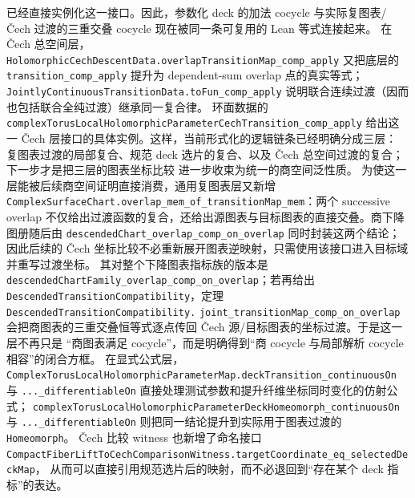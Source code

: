\documentclass[UTF8,fontset=none,a4paper,11pt]{ctexart}
\begin{document}
\begin{sloppypar}
已经直接实例化这一接口。因此，参数化 deck 的加法 cocycle 与实际复图表/Čech 过渡的三重交叠
cocycle 现在被同一条可复用的 Lean 等式连接起来。
在 Čech 总空间层，
\texttt{HolomorphicCechDescentData.overlapTransitionMap\_comp\_apply} 又把底层的
\texttt{transition\_comp\_apply} 提升为 dependent-sum overlap 点的真实等式；
\texttt{JointlyContinuousTransitionData.toFun\_comp\_apply} 说明联合连续过渡（因而也包括联合全纯过渡）继承同一复合律。
环面数据的
\texttt{complexTorusLocalHolomorphicParameterCechTransition\_comp\_apply}
给出这一 Čech 层接口的具体实例。这样，当前形式化的逻辑链条已经明确分成三层：
复图表过渡的局部复合、规范 deck 选片的复合、以及 Čech 总空间过渡的复合；下一步才是把三层的图表坐标比较
进一步收束为统一的商空间泛性质。
为使这一层能被后续商空间证明直接消费，通用复图表层又新增
\texttt{ComplexSurfaceChart.overlap\_mem\_of\_transitionMap\_mem}：两个 successive overlap
不仅给出过渡函数的复合，还给出源图表与目标图表的直接交叠。商下降图册随后由
\texttt{descendedChart\_overlap\_comp\_on\_overlap} 同时封装这两个结论；因此后续的
Čech 坐标比较不必重新展开图表逆映射，只需使用该接口进入目标域并重写过渡坐标。
其对整个下降图表指标族的版本是
\texttt{descendedChartFamily\_overlap\_comp\_on\_overlap}；若再给出
\texttt{DescendedTransitionCompatibility}，定理
\texttt{DescendedTransitionCompatibility.}\allowbreak
\texttt{joint\_transitionMap\_comp\_on\_overlap}
会把商图表的三重交叠恒等式逐点传回 Čech 源/目标图表的坐标过渡。于是这一层不再只是
“商图表满足 cocycle”，而是明确得到“商 cocycle 与局部解析 cocycle 相容”的闭合方框。
在显式公式层，
\texttt{ComplexTorusLocalHolomorphicParameterMap.deckTransition\_continuousOn} 与
\texttt{...\_differentiableOn} 直接处理测试参数和提升纤维坐标同时变化的仿射公式；
\texttt{complexTorusLocalHolomorphicParameterDeckHomeomorph\_continuousOn} 与
\texttt{...\_differentiableOn} 则把同一结论提升到实际用于图表过渡的 \texttt{Homeomorph}。
Čech 比较 witness 也新增了命名接口
\texttt{CompactFiberLiftToCechComparisonWitness.targetCoordinate\_eq\_selectedDeckMap}，
从而可以直接引用规范选片后的映射，而不必退回到“存在某个 deck 指标”的表达。
\end{sloppypar}
\end{document}
